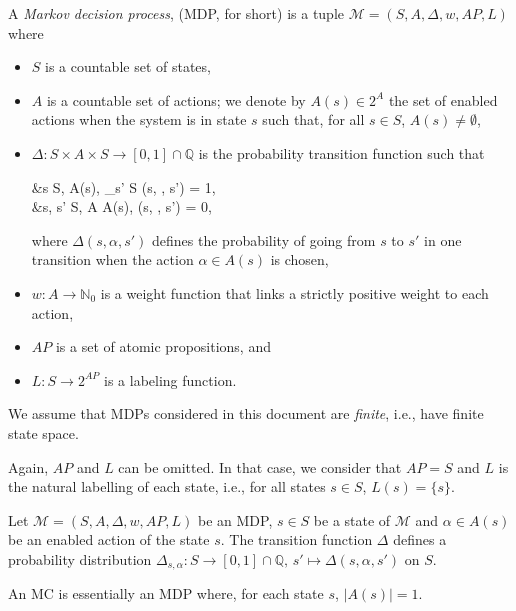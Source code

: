 \begin{definition}
	A \textit{Markov decision process}, (MDP, for short) is a tuple $\mathcal{M}  = (S, A, \Delta, w, AP, L)$ where
	\begin{itemize}
		\item $S$ is a countable set of states,
		\item $A$ is a countable set of actions; we denote by $A(s) \in 2^A$  the set of enabled actions when the system is in state $s$ such that, for all $s \in S$,
    $A(s) \neq \emptyset$,
		\item $\Delta: S \times A \times S \rightarrow [0, 1] \cap \mathbb{Q}$ is the probability transition function such that
		\begin{flalign*}
			&\forall s \in S, \; \forall \alpha \in A(s), \; \sum_{s' \in S} \Delta(s, \alpha, s') = 1,  \\
			&\forall s, s' \in S, \; \forall \alpha \in A \setminus A(s), \; \Delta(s, \alpha, s') = 0,
		\end{flalign*}

			where $\Delta(s, \alpha, s')$ defines the probability of going from $s$ to $s'$ in one transition when the action $\alpha \in A(s)$ is chosen,
    \item $w: A \rightarrow \mathbb{N}_0$ %
      is a weight function that links a strictly positive weight to each action,
    \item $AP$ is a set of atomic propositions, and
    \item $L: S \rightarrow 2^{AP}$ is a labeling function.
	\end{itemize}
\end{definition}
We assume that MDPs considered in this document are \textit{finite}, i.e., have finite state space.

\begin{remark}
  Again, $AP$ and $L$ can be omitted. In that case, we consider that $AP=S$ and $L$ is the natural labelling of each state, i.e., for all states $s \in S$, $L(s) = \{s\}$.
\end{remark}

\begin{property}
  Let $\mathcal{M} = (S,A, \Delta, w, AP, L)$ be an MDP, $s \in S$ be a state of $\mathcal{M}$ and $\alpha \in A(s)$ be an enabled action of the state $s$. The transition function $\Delta$ defines a probability distribution $\Delta_{s, \alpha}: S \rightarrow [0, 1]\cap \mathbb{Q}, \, s' \mapsto \Delta(s, \alpha, s')$ on $S$.
\end{property}
\begin{property}
  An MC is essentially an MDP where, for each state $s$, $|A(s)| = 1$.
\end{property}

